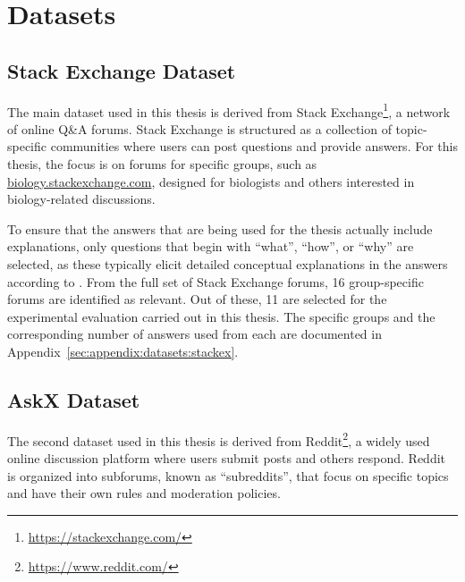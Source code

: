 \chapter{Datasets}%
\label{sec:datasets}


\section{Stack Exchange Dataset}%
\label{sec:datasets:stackex}
The main dataset used in this thesis is derived from Stack Exchange\footnote{\url{https://stackexchange.com/}}, a network of online Q\&A forums. Stack Exchange is structured as a collection of topic-specific communities where users can post questions and provide answers. For this thesis, the focus is on forums for specific groups, such as \url{biology.stackexchange.com}, designed for biologists and others interested in biology-related discussions.

To ensure that the answers that are being used for the thesis actually include explanations, only questions that begin with \enquote{what}, \enquote{how}, or \enquote{why} are selected, as these typically elicit detailed conceptual explanations in the answers according to \citet{millerExplanationArtificialIntelligence2019}. From the full set of Stack Exchange forums, \num{16} group-specific forums are identified as relevant. %
Out of these, \num{11} are selected for the experimental evaluation carried out in this thesis. The specific groups and the corresponding number of answers used from each are documented in Appendix~\ref{sec:appendix:datasets:stackex}.

\section{AskX Dataset}%
\label{sec:datasets:askx}
The second dataset used in this thesis is derived from Reddit\footnote{\url{https://www.reddit.com/}}, a widely used online discussion platform where users submit posts and others respond. Reddit is organized into subforums, known as \enquote{subreddits}, that focus on specific topics and have their own rules and moderation policies.

